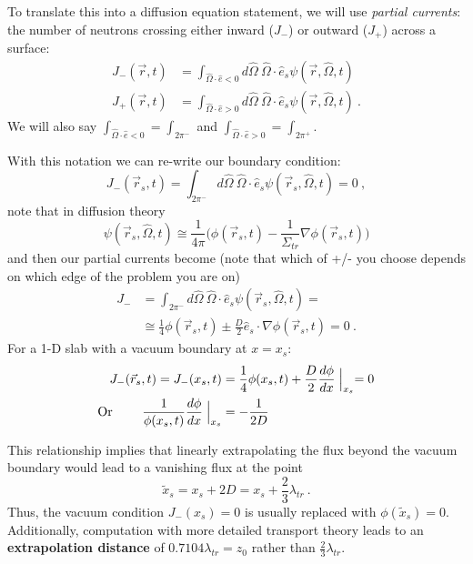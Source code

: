 \documentclass[12pt]{article}
\newcommand{\vOmega}{\ensuremath{\hat{\Omega}}}
\begin{document}
To translate this into a diffusion equation statement, we will use \textit{partial currents}: the number of neutrons crossing either inward ($J_{-}$) or outward ($J_{+}$) across a surface:
\begin{align*}
J_{-}(\vec{r},t) &= \int_{\vOmega \cdot \hat{e} < 0} d\vOmega \: \vOmega \cdot \hat{e}_s \psi(\vec{r}, \vOmega, t) \\
J_{+}(\vec{r},t) &= \int_{\vOmega \cdot \hat{e} > 0} d\vOmega \: \vOmega \cdot \hat{e}_s \psi(\vec{r}, \vOmega, t)\:.
\end{align*}
We will also say $\int_{\vOmega \cdot \hat{e} < 0} = \int_{2\pi^{-}}$ and  $\int_{\vOmega \cdot \hat{e} > 0} = \int_{2\pi^{+}}$. 

With this notation we can re-write our boundary condition:
\[J_{-}(\vec{r}_s,t) = \int_{2\pi^{-}} d\vOmega \: \vOmega \cdot \hat{e}_s \psi(\vec{r}_s, \vOmega, t) = 0 \:,\]
note that in diffusion theory
\[\psi(\vec{r}_s, \vOmega, t) \cong \frac{1}{4\pi}\bigl(\phi(\vec{r}_s, t)  -\frac{1}{\Sigma_{tr}} \nabla \phi(\vec{r}_s, t)\bigr)\]
%
and then our partial currents become (note that which of +/- you choose depends on which edge of the problem you are on)
%
\begin{align*}
J_{-} &= \int_{2\pi^{-}} d\vOmega \: \vOmega \cdot \hat{e}_s \psi(\vec{r}_s, \vOmega, t) =\\
&\cong \frac{1}{4} \phi(\vec{r}_s, t) \pm \frac{D}{2} \hat{e}_s \cdot \nabla \phi(\vec{r}_s, t) = 0\:.
\end{align*} 
%
For a 1-D slab with a vacuum boundary at $x=x_s$:
%
\begin{align*}
J_{-}(\vec{r}_s, t) = J_{-}(x_s, t) &= \frac{1}{4} \phi(x_s, t) + \frac{D}{2}\frac{d \phi}{dx}\Bigm\lvert_{x_s} = 0 \\
\text{Or } \qquad \frac{1}{\phi(x_s, t)}\frac{d \phi}{dx}\Bigm\lvert_{x_s} &= -\frac{1}{2D}
\end{align*}

This relationship implies that linearly extrapolating the flux beyond the vacuum boundary would lead to a vanishing flux at the point
\[\tilde{x}_s = x_s + 2D = x_s + \frac{2}{3}\lambda_{tr}\:.\]
%
Thus, the vacuum condition $J_{-}(x_s) = 0$ is usually replaced with $\phi(\tilde{x}_s)= 0$. Additionally, computation with more detailed transport theory leads to an \textbf{extrapolation distance} of $0.7104\lambda_{tr} = z_0$ rather than $\frac{2}{3}\lambda_{tr}$. 
\end{document}
